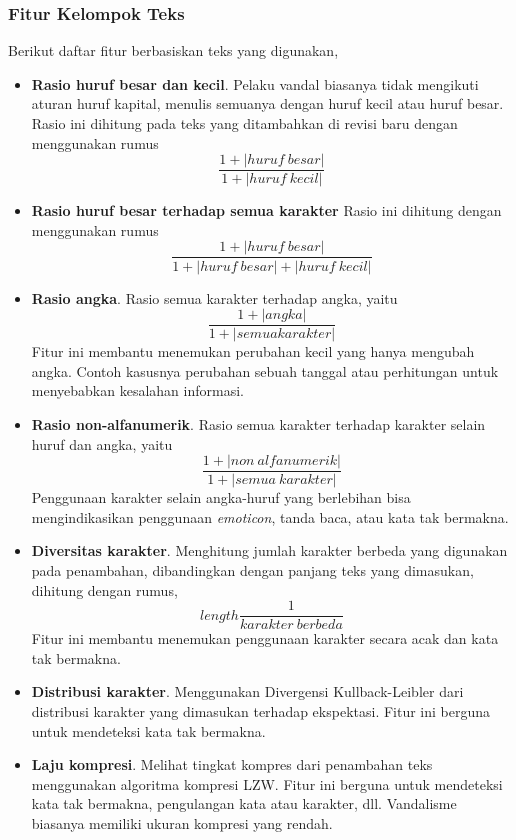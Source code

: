 \subsubsection{Fitur Kelompok Teks}

Berikut daftar fitur berbasiskan teks yang digunakan,

\begin{itemize}

\item \textbf{Rasio huruf besar dan kecil}.
Pelaku vandal biasanya tidak mengikuti aturan huruf kapital, menulis semuanya
dengan huruf kecil atau huruf besar.
Rasio ini dihitung pada teks yang ditambahkan di revisi baru dengan menggunakan
rumus
\[
\frac{1 + |huruf\ besar|}{1 + |huruf\ kecil|}
\]

\item \textbf{Rasio huruf besar terhadap semua karakter}
Rasio ini dihitung dengan menggunakan rumus
\[
\frac{1 + |huruf\ besar|}{1 + |huruf\ besar| + |huruf\ kecil|}
\]

\item \textbf{Rasio angka}.
Rasio semua karakter terhadap angka, yaitu
\[
\frac{1 + |angka|}{1 + |semua karakter|}
\]
Fitur ini membantu menemukan perubahan kecil yang hanya mengubah angka.
Contoh kasusnya perubahan sebuah tanggal atau perhitungan untuk menyebabkan
kesalahan informasi.

\item \textbf{Rasio non-alfanumerik}.
Rasio semua karakter terhadap karakter selain huruf dan angka, yaitu
\[
\frac{1 + |non\ alfanumerik|}{1 + |semua\ karakter|}
\]
Penggunaan karakter selain angka-huruf yang berlebihan bisa mengindikasikan
penggunaan \textit{emoticon}, tanda baca, atau kata tak bermakna.

\item \textbf{Diversitas karakter}.
Menghitung jumlah karakter berbeda yang digunakan pada penambahan, dibandingkan dengan panjang teks yang dimasukan,
dihitung dengan rumus,
\[
length \frac{1}{karakter\ berbeda}
\]
Fitur ini membantu menemukan penggunaan karakter secara acak dan kata tak
bermakna.

\item \textbf{Distribusi karakter}.
Menggunakan Divergensi Kullback-Leibler dari distribusi karakter yang dimasukan
terhadap ekspektasi.
Fitur ini berguna untuk mendeteksi kata tak bermakna.

\item \textbf{Laju kompresi}.
Melihat tingkat kompres dari penambahan teks menggunakan algoritma kompresi
LZW.
Fitur ini berguna untuk mendeteksi kata tak bermakna, pengulangan kata atau
karakter, dll.
Vandalisme biasanya memiliki ukuran kompresi yang rendah.


\end{itemize}
